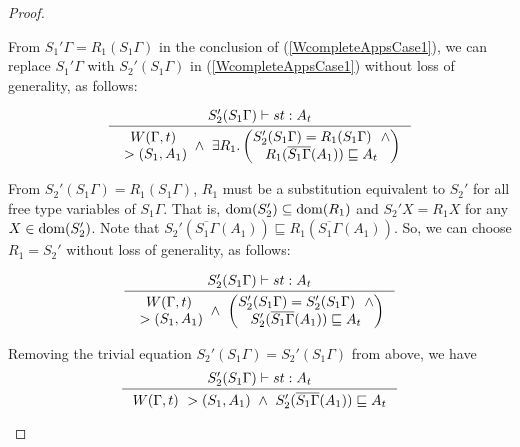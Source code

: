 \begin{proof}
\begin{itemize}
        From $S_1'\Gamma = R_1(S_1\Gamma)$ in the conclusion of 
        (\ref{WcompleteAppsCase1}), we can replace $S_1'\Gamma$
        with $S_2'(S_1\Gamma)$ in (\ref{WcompleteAppsCase1})
        without loss of generality, as follows: \vspace*{-2em}
        \begin{singlespace}
        \begin{align*}
        \inference{S_2'(S_1\Gamma) |-s t : A_t}{
        \begin{matrix} W(\Gamma,t)  \\~> (S_1,A_1) \end{matrix}
        ~\land~ \exists R_1.
        \left(\begin{matrix}
                S_2'(S_1\Gamma)=R_1(S_1\Gamma) ~~\land\\
                R_1(\overline{S_1\Gamma}(A_1))
                \sqsubseteq A_t
        \end{matrix}\right) }
        \end{align*}
        \end{singlespace}
        From $S_2'(S_1\Gamma)=R_1(S_1\Gamma)$, $R_1$ must be a substitution
        equivalent to $S_2'$ for all free type variables of $S_1\Gamma$.
        That is, $\mathop{\mathrm{dom}}(S_2')\subseteq\mathop{\mathrm{dom}}(R_1)$ and $S_2'X = R_1 X$ for
        any $X\in\mathop{\mathrm{dom}}(S_2')$. Note that $S_2'(\overline{S_1\Gamma}(A_1))
        \sqsubseteq R_1(\overline{S_1\Gamma}(A_1))$.
        So, we can choose $R_1=S_2'$ without loss of generality, as follows:
        \vspace*{-2em}
        \begin{singlespace}
        \begin{align*}
        \inference{S_2'(S_1\Gamma) |-s t : A_t}{
        \begin{matrix} W(\Gamma,t)  \\~> (S_1,A_1) \end{matrix}
        ~\land~
        \left(\begin{matrix}
                S_2'(S_1\Gamma)=S_2'(S_1\Gamma) ~~\land\\
                S_2'(\overline{S_1\Gamma}(A_1))
                \sqsubseteq A_t
        \end{matrix}\right) }
        \end{align*}
        \end{singlespace}
        Removing the trivial equation $S_2'(S_1\Gamma)=S_2'(S_1\Gamma)$
        from above, we have
        \begin{equation}
        \inference{ S_2'(S_1\Gamma) |-s t : A_t }{
        W(\Gamma,t) ~> (S_1,A_1) ~\land~
        S_2'(\overline{S_1\Gamma}(A_1)) \sqsubseteq A_t }
        \label{WcompleteAppsCase1'}
        \end{equation}


\end{itemize}
\end{proof}

